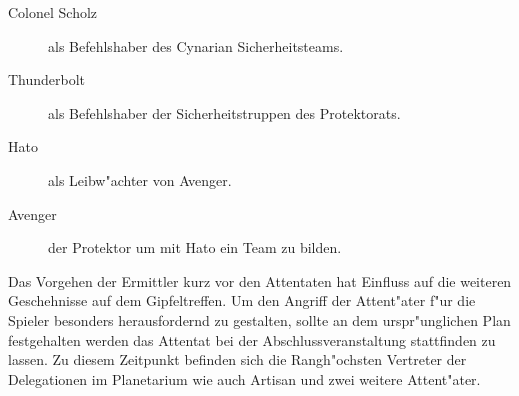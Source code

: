 \begin{description}
	\item[Colonel Scholz] als Befehlshaber des Cynarian Sicherheitsteams.
	\item[Thunderbolt] als Befehlshaber der Sicherheitstruppen des Protektorats.
	\item[Hato] als Leibw"achter von Avenger.
	\item[Avenger] der Protektor um mit Hato ein Team zu bilden.
\end{description}

Das Vorgehen der Ermittler kurz vor den Attentaten hat Einfluss auf die weiteren Geschehnisse auf dem Gipfeltreffen. Um den Angriff der Attent"ater f"ur die Spieler besonders herausfordernd zu gestalten, sollte an dem urspr"unglichen Plan festgehalten werden das Attentat bei der Abschlussveranstaltung stattfinden zu lassen. Zu diesem Zeitpunkt befinden sich die Rangh"ochsten Vertreter der Delegationen im Planetarium wie auch Artisan und zwei weitere Attent"ater.

